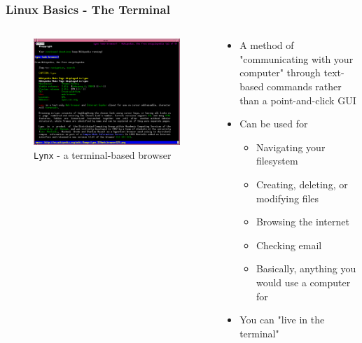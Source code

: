 \documentclass{beamer}
\begin{document}
\begin{frame}
  \frametitle{Linux Basics - The Terminal}
  \begin{columns}[t]
    \begin{column}{.5\textwidth}
      \begin{figure}
        \centering
        \includegraphics[width=\linewidth]{lynx.png}
        \caption{\texttt{Lynx} - a terminal-based browser}
      \end{figure}
    \end{column}
    \begin{column}{.5\textwidth}
      \begin{itemize}
        \item A method of "communicating with your computer" through text-based commands rather than a point-and-click GUI
        \item Can be used for
          \begin{itemize}
            \item Navigating your filesystem
            \item Creating, deleting, or modifying files
            \item Browsing the internet
            \item Checking email
            \item Basically, anything you would use a computer for
          \end{itemize}
        \item You can "live in the terminal"
      \end{itemize}
    \end{column}
  \end{columns}
\end{frame}
\end{document}
